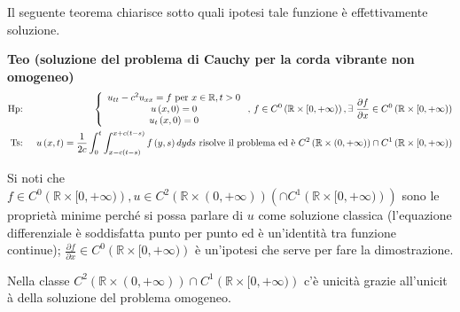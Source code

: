 \documentclass{article}
\begin{document}
Il seguente teorema chiarisce sotto quali ipotesi tale funzione \`{e}
effettivamente soluzione.

\textbf{Teo (soluzione del problema di Cauchy per la corda vibrante non
omogeneo)}%
\begin{eqnarray*}
\text{Hp} &\text{: }&\left\{ 
\begin{array}{c}
u_{tt}-c^{2}u_{xx}=f\text{ per }x\in 
\mathbb{R}
,t>0 \\ 
u\left( x,0\right) =0 \\ 
u_{t}\left( x,0\right) =0%
\end{array}%
\right. \text{, }f\in C^{0}\left( 
\mathbb{R}
\times \lbrack 0,+\infty )\right) ,\exists \text{ }\frac{\partial f}{%
\partial x}\in C^{0}\left( 
\mathbb{R}
\times \lbrack 0,+\infty )\right) \\
\text{Ts} &\text{: }&u\left( x,t\right) =\frac{1}{2c}\int_{0}^{t}\int_{x-c%
\left( t-s\right) }^{x+c\left( t-s\right) }f\left( y,s\right) dyds\text{
risolve il problema ed \`{e} }C^{2}\left( 
\mathbb{R}
\times (0,+\infty )\right) \cap C^{1}\left( 
\mathbb{R}
\times \lbrack 0,+\infty )\right)
\end{eqnarray*}

Si noti che $f\in C^{0}\left( 
\mathbb{R}
\times \lbrack 0,+\infty )\right) ,u\in C^{2}\left( 
\mathbb{R}
\times (0,+\infty )\right) \left( \cap C^{1}\left( 
\mathbb{R}
\times \lbrack 0,+\infty )\right) \right) $ sono le propriet\`{a} minime
perch\'{e} si possa parlare di $u$ come soluzione classica (l'equazione
differenziale \`{e} soddisfatta punto per punto ed \`{e} un'identit\`{a} tra
funzione continue); $\frac{\partial f}{\partial x}\in C^{0}\left( 
\mathbb{R}
\times \lbrack 0,+\infty )\right) $ \`{e} un'ipotesi che serve per fare la
dimostrazione.

Nella classe $C^{2}\left( 
\mathbb{R}
\times (0,+\infty )\right) \cap C^{1}\left( 
\mathbb{R}
\times \lbrack 0,+\infty )\right) $ c'\`{e} unicit\`{a} grazie all'unicit%
\`{a} della soluzione del problema omogeneo.
\end{document}
